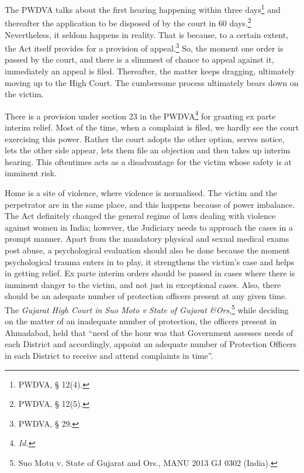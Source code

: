 \begin{multicols}{2}
\noi
The PWDVA talks about the first hearing happening within three days\footnote{PWDVA, § 12(4).} and thereafter the
application to be disposed of by the court in 60 days.\footnote{PWDVA, § 12(5).} Nevertheless, it seldom happens in
reality. That is because, to a certain extent, the Act itself provides for a provision of appeal.\footnote{PWDVA, § 29.}
So, the moment one order is passed by the court, and there is a slimmest of chance to appeal
against it, immediately an appeal is filed. Thereafter, the matter keeps dragging, ultimately
moving up to the High Court. The cumbersome process ultimately bears down on the victim.

\noi
There is a provision under section 23 in the PWDVA\footnote{\textit{Id.}} for granting ex parte interim relief.
Most of the time, when a complaint is filed, we hardly see the court exercising this power.
Rather the court adopts the other option, serves notice, lets the other side appear, lets them
file an objection and then takes up interim hearing. This oftentimes acts as a disadvantage for
the victim whose safety is at imminent risk. 

\noi
Home is a site of violence, where violence is normalised. The victim and the perpetrator are
in the same place, and this happens because of power imbalance. The Act definitely changed
the general regime of laws dealing with violence against women in India; however, the
Judiciary needs to approach the cases in a prompt manner. Apart from the mandatory
physical and sexual medical exams post abuse, a psychological evaluation should also be
done because the moment psychological trauma enters in to play, it strengthens the victim’s
case and helps in getting relief. Ex parte interim orders should be passed in cases where there
is imminent danger to the victim, and not just in exceptional cases. Also, there should be an
adequate number of protection officers present at any given time. The \textit{Gujarat High Court in
Suo Moto v State of Gujarat \&Ors},\footnote{Suo Motu v. State of Gujarat and Ors., MANU 2013 GJ 0302 (India).} while deciding on the matter of an inadequate number
of protection, the officers present in Ahmadabad, held that “need of the hour was that Government assesses needs of each District and accordingly, appoint an adequate number of
Protection Officers in each District to receive and attend complaints in time”.



\end{multicols}
